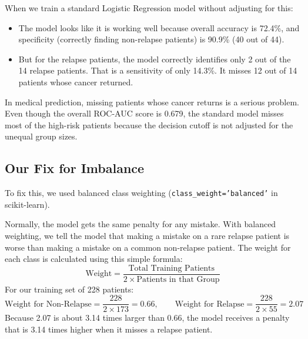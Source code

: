 \documentclass[11pt,a4paper]{article}
\begin{document}
When we train a standard Logistic Regression model without adjusting for this:
\begin{itemize}
    \item The model looks like it is working well because overall accuracy is 72.4\%, and specificity (correctly finding non-relapse patients) is 90.9\% (40 out of 44).
    \item But for the relapse patients, the model correctly identifies only 2 out of the 14 relapse patients. That is a sensitivity of only 14.3\%. It misses 12 out of 14 patients whose cancer returned.
\end{itemize}
In medical prediction, missing patients whose cancer returns is a serious problem. Even though the overall ROC-AUC score is 0.679, the standard model misses most of the high-risk patients because the decision cutoff is not adjusted for the unequal group sizes.

\subsection{Our Fix for Imbalance}
To fix this, we used balanced class weighting (\texttt{class\_weight='balanced'} in scikit-learn). 

Normally, the model gets the same penalty for any mistake. With balanced weighting, we tell the model that making a mistake on a rare relapse patient is worse than making a mistake on a common non-relapse patient. The weight for each class is calculated using this simple formula:
\begin{equation}
\text{Weight} = \frac{\text{Total Training Patients}}{2 \times \text{Patients in that Group}}
\end{equation}
For our training set of 228 patients:
\begin{equation}
\text{Weight for Non-Relapse} = \frac{228}{2 \times 173} = 0.66, \qquad 
\text{Weight for Relapse} = \frac{228}{2 \times 55} = 2.07
\end{equation}
Because 2.07 is about 3.14 times larger than 0.66, the model receives a penalty that is 3.14 times higher when it misses a relapse patient.
\end{document}
